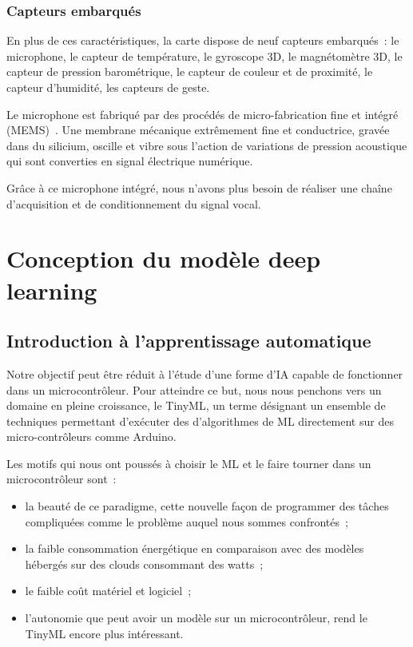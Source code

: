 \documentclass[a4paper,12pt,twoside]{report}
\theoremstyle{definition}
\theoremstyle{plain}
\theoremstyle{remark}
\begin{document}
\subsection{Capteurs embarqués}

En plus de ces caractéristiques, la carte dispose de neuf capteurs embarqués~: le microphone, le capteur de température, le gyroscope 3D, le magnétomètre 3D, le capteur de pression barométrique, le capteur de couleur et de proximité, le capteur d'humidité, les capteurs de geste.

Le microphone est fabriqué par des procédés de micro-fabrication fine et intégré (\ac{MEMS})~\cite{mp34dt05a_datasheet}. Une membrane mécanique extrêmement fine et conductrice, gravée dans du silicium, oscille et vibre sous l'action de variations de pression acoustique qui sont converties en signal électrique numérique.

Grâce à ce microphone intégré, nous n'avons plus besoin de réaliser une chaîne d'acquisition et de conditionnement du signal vocal.

\chapter{Conception du modèle deep learning}

\section{Introduction à l'apprentissage automatique}

Notre objectif peut être réduit à l'étude d'une forme d'\ac{IA} capable de fonctionner dans un microcontrôleur. Pour atteindre ce but, nous nous penchons vers un domaine en pleine croissance, le \ac{TinyML}, un terme désignant un ensemble de techniques permettant d'exécuter des d'algorithmes de \ac{ML} directement sur des micro-contrôleurs comme Arduino.

Les motifs qui nous ont poussés à choisir le \ac{ML} et le faire tourner dans un microcontrôleur sont~:
\begin{itemize}
	\item la beauté de ce paradigme, cette nouvelle façon de programmer des tâches compliquées comme le problème auquel nous sommes confrontés~;
	\item la faible consommation énergétique en comparaison avec des modèles hébergés sur des clouds consommant des watts~;
	\item le faible coût matériel et logiciel~;
	\item l'autonomie que peut avoir un modèle sur un microcontrôleur, rend le \ac{TinyML} encore plus intéressant.
\end{itemize}
\end{document}
